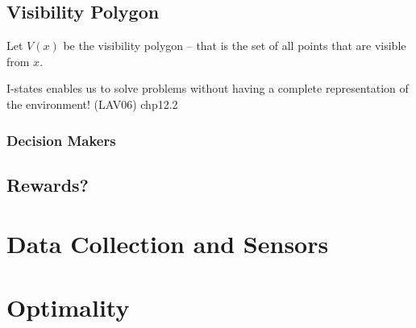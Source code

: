 \subsection{Visibility Polygon}
Let \(V(x)\) be the visibility polygon -- that is the set of all points that are
visible from \(x\).

I-states enables us to solve problems without having a complete representation
of the environment! (LAV06) chp12.2



\subsubsection{Decision Makers}

\subsection{Rewards?}

\section{Data Collection and Sensors}



\section{Optimality}
